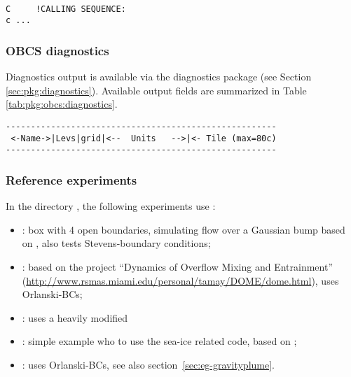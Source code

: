 {\footnotesize
\begin{verbatim}

C     !CALLING SEQUENCE:
c ...

\end{verbatim}
}


\subsubsection{OBCS diagnostics
\label{sec:pkg:obcs:diagnostics}}

Diagnostics output is available via the diagnostics package
(see Section \ref{sec:pkg:diagnostics}).
Available output fields are summarized in 
Table \ref{tab:pkg:obcs:diagnostics}.

\begin{table}[!ht]
\centering
\label{tab:pkg:obcs:diagnostics}
{\footnotesize
\begin{verbatim}
------------------------------------------------------
 <-Name->|Levs|grid|<--  Units   -->|<- Tile (max=80c)
------------------------------------------------------

\end{verbatim}
}
\caption{~}
\end{table}


\subsubsection{Reference experiments}
In the directory , the following experiments use
: 
\begin{itemize}
\item {}: box with 4 open boundaries, simulating flow over a
  Gaussian bump based on \citet{adcroft:97}, also tests
  Stevens-boundary conditions;
\item {}: based on the project ``Dynamics of Overflow Mixing
  and Entrainment''
  (\url{http://www.rsmas.miami.edu/personal/tamay/DOME/dome.html}), uses
  Orlanski-BCs;
\item {}: uses a heavily modified 
\item {}: simple example who to use the sea-ice
  related code, based on ;
\item {}: uses Orlanski-BCs, see also
  section~\ref{sec:eg-gravityplume}.
\end{itemize}



